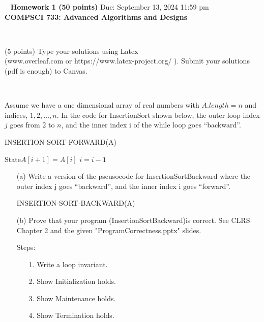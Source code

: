 \documentclass[12pt]{article}
\newcommand{\vs}{\vspace{2mm}}
\newcommand{\ls}{\vspace{5mm}}
\newcommand{\bc}{\begin{center}}
\newcommand{\ec}{\end{center}}
\begin{document}
\bc\ { \bf  Homework  1 (50 points)}  Due: September 13, 2024 11:59 pm\\

 { \bf COMPSCI 733: Advanced Algorithms and Designs } \ec\ 
\ls\

 (5 points)
Type your solutions using Latex \\
(www.overleaf.com or https://www.latex-project.org/ ). Submit your solutions (pdf is enough)  to Canvas. 




\vs\

Assume we have a one dimensional array of real numbers with $A.length = n$ and indices, $1, 2, \ldots, n$.
In the code for InsertionSort  shown below, the outer loop index $j$ goes from 2 to $n$, and the inner index i of the while loop goes “backward”. 

\begin{algorithm}
\caption{INSERTION-SORT-FORWARD(A)}
\begin{algorithmic}[1]
\State{$i=j-1$}
  State{$A[i+1]=A[i]$} 
    \State $i = i-1$
\EndWhile
{}
\EndFor
\end{algorithmic}
\end{algorithm}

\begin{itemize}
 \item[(a)] Write a version of the pseusocode for InsertionSortBackward where the outer index j goes “backward”, and the inner index i goes “forward”.  

\begin{algorithm}
\caption{INSERTION-SORT-BACKWARD(A)}
\begin{algorithmic}[1]
\end{algorithmic}
\end{algorithm}

\item[(b)] Prove that your program (InsertionSortBackward)is correct.
See CLRS Chapter 2 and the given "ProgramCorrectness.pptx" slides.

Steps:
\begin{itemize}
\item[1.]	 Write a loop invariant.
\item[2.]	Show Initialization holds.
\item[3.]Show Maintenance  holds.
\item[4.]	Show Termination holds.
\end{itemize}
\end{itemize}
\end{document}
